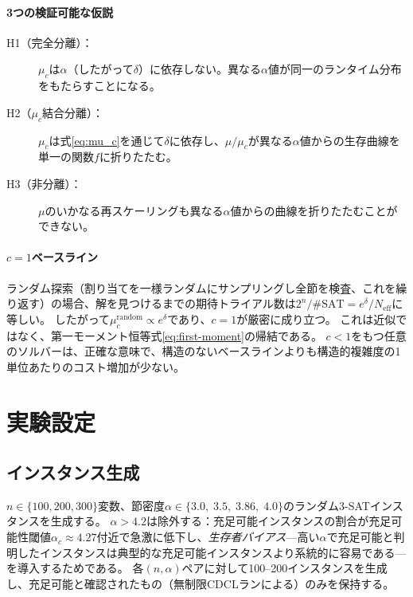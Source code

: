 \documentclass[11pt,a4paper]{article}
\newcommand{\mc}{\mu_c}
\newcommand{\Neff}{N_{\text{eff}}}
\begin{document}
\paragraph{3つの検証可能な仮説}
\begin{description}
\item[H1（完全分離）：] $\mc$は$\alpha$（したがって$\delta$）に依存しない。異なる$\alpha$値が同一のランタイム分布をもたらすことになる。
\item[H2（$\mc$結合分離）：] $\mc$は式\eqref{eq:mu_c}を通じて$\delta$に依存し、$\mu/\mc$が異なる$\alpha$値からの生存曲線を単一の関数$f$に折りたたむ。
\item[H3（非分離）：] $\mu$のいかなる再スケーリングも異なる$\alpha$値からの曲線を折りたたむことができない。
\end{description}

\paragraph{$c = 1$ベースライン}
ランダム探索（割り当てを一様ランダムにサンプリングし全節を検査、これを繰り返す）の場合、解を見つけるまでの期待トライアル数は$2^n / \#\text{SAT} = e^{\delta} / \Neff$に等しい。
したがって$\mc^{\text{random}} \propto e^{\delta}$であり、$c = 1$が厳密に成り立つ。
これは近似ではなく、第一モーメント恒等式\eqref{eq:first-moment}の帰結である。
$c < 1$をもつ任意のソルバーは、正確な意味で、構造のないベースラインよりも構造的複雑度の1単位あたりのコスト増加が少ない。


\section{実験設定}
\label{sec:experiments}

\subsection{インスタンス生成}

$n \in \{100, 200, 300\}$変数、節密度$\alpha \in \{3.0,\; 3.5,\; 3.86,\; 4.0\}$のランダム3-SATインスタンスを生成する。
$\alpha > 4.2$は除外する：充足可能インスタンスの割合が充足可能性閾値$\alpha_c \approx 4.27$付近で急激に低下し、\emph{生存者バイアス}---高い$\alpha$で充足可能と判明したインスタンスは典型的な充足可能インスタンスより系統的に容易である---を導入するためである。
各$(n, \alpha)$ペアに対して100--200インスタンスを生成し、充足可能と確認されたもの（無制限CDCLランによる）のみを保持する。
\end{document}
